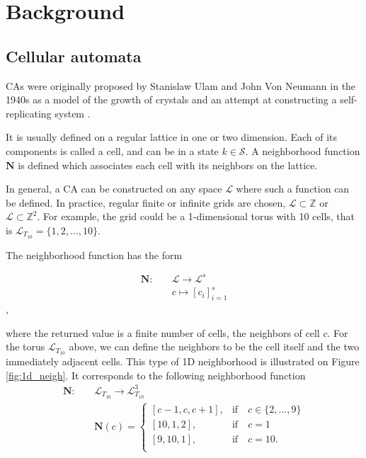 \chapter{Background}
\label{cha:background}

\section{Cellular automata}

\Acp{CA} were originally proposed by Stanislaw Ulam and John Von
Neumann in the 1940s as a model of the growth of crystals and an attempt at
constructing a self-replicating system \cite{von_neumann_theory_1966}.

It is usually defined on a regular lattice in one or two dimension. Each of its
components is called a cell, and can be in a state $k \in \mathcal{S}$. A neighborhood
function $\boldsymbol{N}$ is defined which associates each cell with its
neighbors on the lattice.

In general, a \ac{CA} can be constructed on any space
$\mathcal{L}$ where such a function can be defined.
In practice, regular finite or infinite grids are chosen, $\mathcal{L} \subset \mathbb{Z}$ or
$\mathcal{L} \subset \mathbb{Z}^{2}$. For example, the grid could be a 1-dimensional torus with 10 cells,
that is $\mathcal{L}_{{T_{10}}} = \{1, 2, \ldots, 10 \}$.

The neighborhood function has the form

\begin{equation}
  \begin{aligned}
\boldsymbol{N} :\quad & \mathcal{L} \rightarrow \mathcal{L}^{s}\\
&c \mapsto [c_{i}]_{i=1}^{s}
  \end{aligned}
\end{equation}
,

where the returned value is a finite number of cells, the neighbors of cell $c$.
For the torus $\mathcal{L}_{T_{10}}$ above, we can define the neighbors to be the cell
itself and the two immediately adjacent cells. This type of 1D neighborhood is
illustrated on Figure \ref{fig:1d_neigh}. It corresponds to the following
neighborhood function
\begin{equation}
  \begin{aligned}
\boldsymbol{N} :\quad & \mathcal{L}_{T_{10}} \rightarrow \mathcal{L}_{T_{10}}^{3} \\
&\boldsymbol{N}(c) = \begin{cases}
                      [c - 1, c, c + 1],& \text{if}\quad c \in \{2,\ldots , 9\}\\
                       [10, 1, 2], & \text{if} \quad c = 1 \\
                       [9, 10, 1], & \text{if} \quad c = 10. \\
                    \end{cases}
  \end{aligned}
\end{equation}

